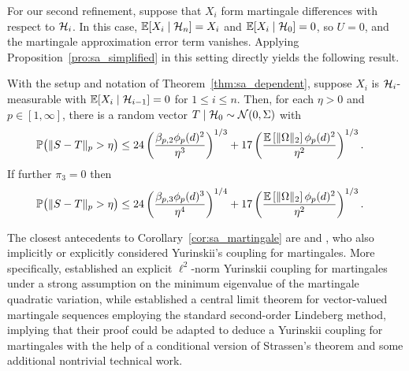 For our second refinement, suppose that
$X_i$ form martingale differences with respect to $\mathcal{H}_i$.
In this case, $\mathbb{E}[X_i \mid \mathcal{H}_n] = X_i$ and $\mathbb{E}[X_i \mid \mathcal{H}_0] = 0$,
so $U = 0$, and the martingale approximation error term vanishes.
Applying Proposition~\ref{pro:sa_simplified} in this setting
directly yields the following result.
%
\begin{corollary}%
  \label{cor:sa_martingale}

  With the setup and notation of Theorem~\ref{thm:sa_dependent}, suppose $X_i$
  is $\mathcal{H}_i$-measurable with $\mathbb{E}[X_i \mid \mathcal{H}_{i-1}] = 0$ for
  $1 \leq i \leq n$. Then, for each $\eta > 0$ and $p \in [1,\infty]$, there is
  a random vector $T \mid \mathcal{H}_0 \sim \mathcal{N}(0, \Sigma)$ with
  \begin{align}
    \label{eq:sa_martingale_order_2}
    \mathbb{P}\big(\|S-T\|_p > \eta\big)
    &\leq
    24 \left(
      \frac{\beta_{p,2} \phi_p(d)^2}{\eta^3}
    \right)^{1/3}
    + 17 \left(
      \frac{\mathbb{E} \left[ \|\Omega\|_2 \right] \phi_p(d)^2}{\eta^2}
    \right)^{1/3}.
  \end{align}
  If further $\pi_3 = 0$ then
  \begin{align}
    \label{eq:sa_martingale_order_3}
    \mathbb{P}\big(\|S-T\|_p > \eta\big)
    &\leq
    24 \left(
      \frac{\beta_{p,3} \phi_p(d)^3}{\eta^4}
    \right)^{1/4}
    + 17 \left(
      \frac{\mathbb{E} \left[ \|\Omega\|_2 \right] \phi_p(d)^2}{\eta^2}
    \right)^{1/3}.
  \end{align}
\end{corollary}

The closest antecedents to Corollary~\ref{cor:sa_martingale} are
\citet{belloni2018high} and \citet{li2020uniform}, who also implicitly or
explicitly considered Yurinskii's coupling for martingales. More specifically,
\citet[Theorem 1]{li2020uniform} established an explicit
$\ell^2$-norm Yurinskii coupling
for martingales under a strong assumption on the minimum eigenvalue of the
martingale quadratic variation, while \citet[Theorem 2.1]{belloni2018high}
established a
central limit theorem for vector-valued martingale sequences employing the
standard second-order Lindeberg method, implying that their proof could be
adapted to deduce a Yurinskii coupling for martingales with the help of a
conditional version of Strassen's theorem \citep{chen2020jackknife} and some
additional nontrivial technical work.

